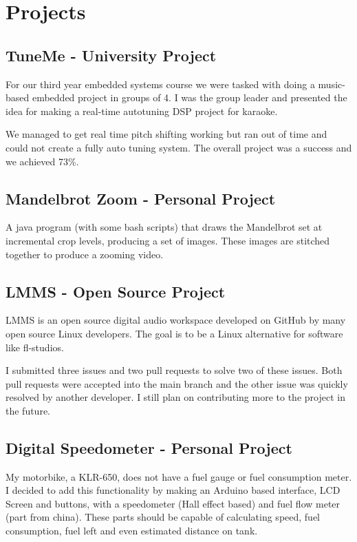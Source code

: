 \documentclass[twocolumn, 8pt]{extarticle}
\begin{document}
\newpage
\section{Projects}

\subsection{TuneMe - University Project}

For our third year embedded systems course we were
tasked with doing a music-based embedded project in
groups of 4. I was the group leader and presented the idea
for making a real-time autotuning DSP project for karaoke.

We managed to get real time pitch shifting working but ran
out of time and could not create a fully auto tuning system.
The overall project was a success and we achieved 73\%.

\subsection{Mandelbrot Zoom - Personal Project}

A java program (with some bash scripts) that draws the
Mandelbrot set at incremental crop levels, producing a set
of images. These images are stitched together to produce a
zooming video.

\subsection{LMMS - Open Source Project}

LMMS is an open source digital audio workspace developed
on GitHub by many open source Linux developers. The goal
is to be a Linux alternative for software like fl-studios.

I submitted three issues and two pull requests to solve two
of these issues. Both pull requests were accepted into the
main branch and the other issue was quickly resolved by
another developer. I still plan on contributing more to the
project in the future.

\subsection{Digital Speedometer - Personal Project}

My motorbike, a KLR-650, does not have a fuel gauge or fuel
consumption meter. I decided to add this functionality by
making an Arduino based interface, LCD Screen and
buttons, with a speedometer (Hall effect based) and fuel
flow meter (part from china). These parts should be capable
of calculating speed, fuel consumption, fuel left and even
estimated distance on tank.
\end{document}
